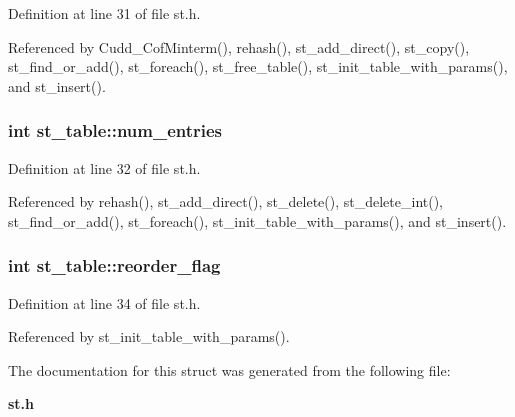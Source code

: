 Definition at line 31 of file st.h.

Referenced by Cudd\_\-Cof\-Minterm(), rehash(), st\_\-add\_\-direct(), st\_\-copy(), st\_\-find\_\-or\_\-add(), st\_\-foreach(), st\_\-free\_\-table(), st\_\-init\_\-table\_\-with\_\-params(), and st\_\-insert().
\subsubsection{\setlength{\rightskip}{0pt plus 5cm}int \bf{st\_\-table::num\_\-entries}}\label{structst__table_4f720b56253518cde537ade35a3b591a}




Definition at line 32 of file st.h.

Referenced by rehash(), st\_\-add\_\-direct(), st\_\-delete(), st\_\-delete\_\-int(), st\_\-find\_\-or\_\-add(), st\_\-foreach(), st\_\-init\_\-table\_\-with\_\-params(), and st\_\-insert().
\subsubsection{\setlength{\rightskip}{0pt plus 5cm}int \bf{st\_\-table::reorder\_\-flag}}\label{structst__table_0b4d6444e7e22ff9a68f75f6cccb75cd}




Definition at line 34 of file st.h.

Referenced by st\_\-init\_\-table\_\-with\_\-params().

The documentation for this struct was generated from the following file:\begin{CompactItemize}
\item 
\bf{st.h}\end{CompactItemize}
